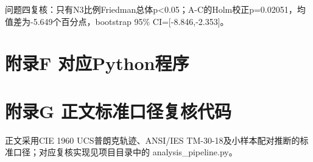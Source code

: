 \documentclass[UTF8,a4paper,12pt]{ctexart}
\begin{document}
问题四复核：只有N3比例Friedman总体p<0.05；A-C的Holm校正p=0.02051，均值差为-5.649个百分点，bootstrap 95\% CI=[-8.846,-2.353]。

\clearpage

\section*{附录F 对应Python程序}




\section*{附录G 正文标准口径复核代码}

正文采用CIE 1960 UCS普朗克轨迹、ANSI/IES TM-30-18及小样本配对推断的标准口径；对应复核实现见项目目录中的 analysis\_pipeline.py。


\end{document}
